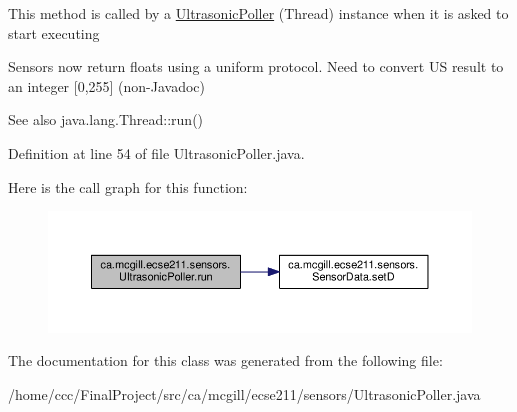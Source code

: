 This method is called by a \hyperlink{classca_1_1mcgill_1_1ecse211_1_1sensors_1_1_ultrasonic_poller}{Ultrasonic\+Poller} (Thread) instance when it is asked to start executing

Sensors now return floats using a uniform protocol. Need to convert US result to an integer \mbox{[}0,255\mbox{]} (non-\/\+Javadoc)

\begin{DoxySeeAlso}{See also}
java.\+lang.\+Thread\+::run() 
\end{DoxySeeAlso}


Definition at line 54 of file Ultrasonic\+Poller.\+java.

Here is the call graph for this function\+:\nopagebreak
\begin{figure}[H]
\begin{center}
\leavevmode
\includegraphics[width=350pt]{classca_1_1mcgill_1_1ecse211_1_1sensors_1_1_ultrasonic_poller_acc71fac612a72c197244c71d6cf7b6e1_cgraph}
\end{center}
\end{figure}


The documentation for this class was generated from the following file\+:\begin{DoxyCompactItemize}
\item 
/home/ccc/\+Final\+Project/src/ca/mcgill/ecse211/sensors/Ultrasonic\+Poller.\+java\end{DoxyCompactItemize}
